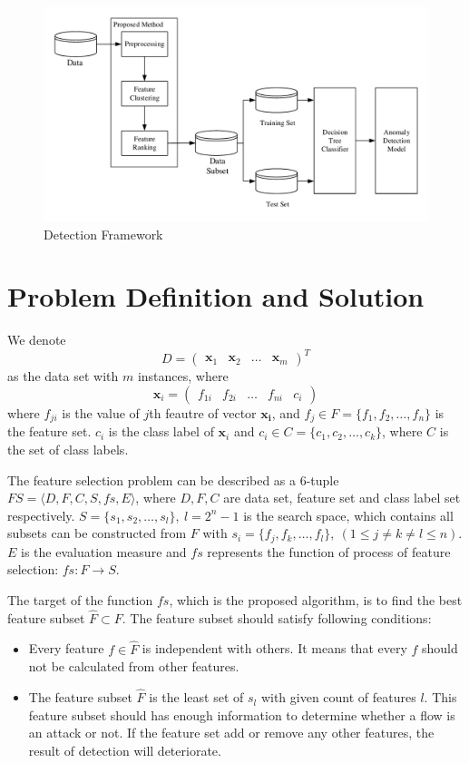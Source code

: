 \documentclass[journal]{IEEEtran}
\begin{document}
\begin{figure}[!htbp]
    \centering
    \includegraphics[scale=0.75]{fig/Framework.pdf}
    \caption{Detection Framework}
    \label{fig:framework}
\end{figure}

\section{Problem Definition and Solution}
\label{sec:problem}
We denote 
$$D=\left(\begin{array}{llll}
    \bm{x}_1 & \bm{x}_2 & \ldots & \bm{x}_m
\end{array}\right)^T$$
as the data set with $m$ instances, where 
$$\bm{x}_i = \left(\begin{array}{lllll}
    f_{1i} & f_{2i} & \ldots & f_{ni} & c_i
\end{array}\right)$$
where $f_{ji}$ is the value of $j$th feautre of vector $\bm{x_i}$, and $f_j \in F = \{f_1, f_2, \ldots, f_n\}$ is the feature set. $c_i$ is the class label of $\bm{x}_i$ and $c_i \in C = \{c_1, c_2, \ldots, c_k\}$, where $C$ is the set of class labels.

The feature selection problem\cite{Maza2018} can be described as a 6-tuple $FS=\langle D, F, C, S, fs, E \rangle$, where $D, F, C$ are data set, feature set and class label set respectively. $S=\{s_1, s_2, \ldots, s_l\}, \ l=2^n-1$ is the search space, which contains all subsets can be constructed from $F$ with $s_i=\{f_j, f_k, \ldots, f_l\}, \ (1 \leqslant j \neq k \neq l \leqslant n)$. $E$ is the evaluation measure and $fs$ represents the function of process of feature selection: $fs: F \rightarrow S$.

The target of the function $fs$, which is the proposed algorithm, is to find the best feature subset $\hat{F} \subset F$. The feature subset should satisfy following conditions:
\begin{itemize}
    \item Every feature $f \in \hat{F}$ is independent with others. It means that every $f$ should not be calculated from other features.
    \item The feature subset $\hat{F}$ is the least set of $s_l$ with given count of features $l$. This feature subset should has enough information to determine whether a flow is an attack or not. If the feature set add or remove any other features, the result of detection will deteriorate.
\end{itemize}
\end{document}
